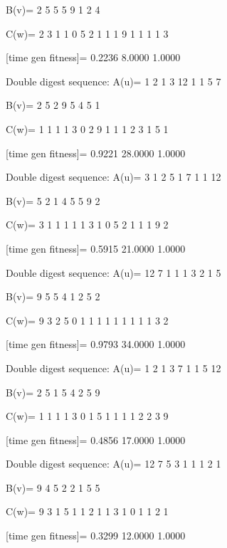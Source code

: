 B(v)=
     2     5     5     5     9     1     2     4

C(w)=
     2     3     1     1     0     5     2     1     1     1     9     1     1     1     1     3

[time gen fitness]=
    0.2236    8.0000    1.0000

Double digest sequence:
A(u)=
     1     2     1     3    12     1     1     5     7

B(v)=
     2     5     2     9     5     4     5     1

C(w)=
     1     1     1     1     3     0     2     9     1     1     1     2     3     1     5     1

[time gen fitness]=
    0.9221   28.0000    1.0000

Double digest sequence:
A(u)=
     3     1     2     5     1     7     1     1    12

B(v)=
     5     2     1     4     5     5     9     2

C(w)=
     3     1     1     1     1     1     3     1     0     5     2     1     1     1     9     2

[time gen fitness]=
    0.5915   21.0000    1.0000

Double digest sequence:
A(u)=
    12     7     1     1     1     3     2     1     5

B(v)=
     9     5     5     4     1     2     5     2

C(w)=
     9     3     2     5     0     1     1     1     1     1     1     1     1     1     3     2

[time gen fitness]=
    0.9793   34.0000    1.0000

Double digest sequence:
A(u)=
     1     2     1     3     7     1     1     5    12

B(v)=
     2     5     1     5     4     2     5     9

C(w)=
     1     1     1     1     3     0     1     5     1     1     1     1     2     2     3     9

[time gen fitness]=
    0.4856   17.0000    1.0000

Double digest sequence:
A(u)=
    12     7     5     3     1     1     1     2     1

B(v)=
     9     4     5     2     2     1     5     5

C(w)=
     9     3     1     5     1     1     2     1     1     3     1     0     1     1     2     1

[time gen fitness]=
    0.3299   12.0000    1.0000

